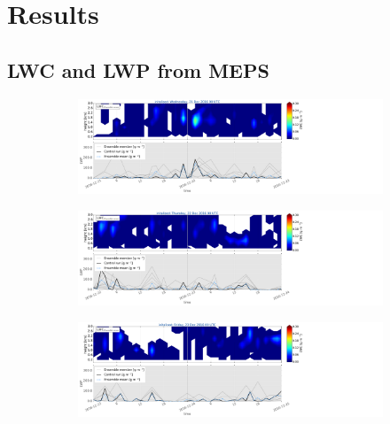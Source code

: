 \chapter{Results}
\section{LWC and LWP from MEPS}%
\label{app:LWP_MEPS}

\begin{figure}[t]%
	\centering
	\begin{subfigure}[t]{0.85\textwidth}
		\includegraphics[trim={.5cm 0.5cm 27cm .5cm},clip,width=\textwidth]{./fig_LWC/20161221}
		\caption{}\label{fig:LWC21}
	\end{subfigure}
	\centering
	\begin{subfigure}[t]{0.85\textwidth}
		\includegraphics[trim={0.5cm 0.5cm 27cm .5cm},clip,width=\textwidth]{./fig_LWC/20161222}
		\caption{}\label{fig:LWC22}
	\end{subfigure}
	\centering
	\begin{subfigure}[t]{0.85\textwidth}
		\includegraphics[trim={0.5cm 0.5cm 27cm .5cm},clip,width=\textwidth]{./fig_LWC/20161223}
		\caption{}\label{fig:LWC23}
	\end{subfigure}
\end{figure}
